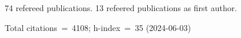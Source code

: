74 refereed publications. 13 refeered publications as first author.

Total citations~=~4108; h-index~=~35 (2024-06-03)